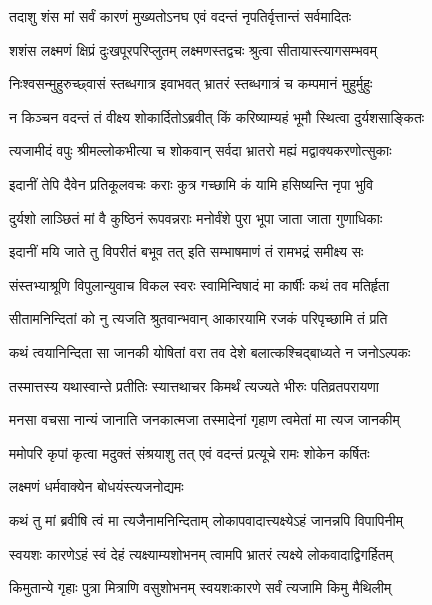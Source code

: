 \twolineshloka
{तदाशु शंस मां सर्वं कारणं मुख्यतोऽनघ}
{एवं वदन्तं नृपतिर्वृत्तान्तं सर्वमादितः}%

\twolineshloka
{शशंस लक्ष्मणं क्षिप्रं दुःखपूरपरिप्लुतम्}
{लक्ष्मणस्तद्वचः श्रुत्वा सीतायास्त्यागसम्भवम्}%

\twolineshloka
{निःश्वसन्मुहुरुच्छ्वासं स्तब्धगात्र इवाभवत्}
{भ्रातरं स्तब्धगात्रं च कम्पमानं मुहुर्मुहुः}%

\twolineshloka
{न किञ्चन वदन्तं तं वीक्ष्य शोकार्दितोऽब्रवीत्}
{किं करिष्याम्यहं भूमौ स्थित्वा दुर्यशसाङ्कितः}%

\twolineshloka
{त्यजामीदं वपुः श्रीमल्लोकभीत्या च शोकवान्}
{सर्वदा भ्रातरो मह्यं मद्वाक्यकरणोत्सुकाः}%

\twolineshloka
{इदानीं तेपि दैवेन प्रतिकूलवचः कराः}
{कुत्र गच्छामि कं यामि हसिष्यन्ति नृपा भुवि}%

\twolineshloka
{दुर्यशो लाञ्छितं मां वै कुष्ठिनं रूपवन्नराः}
{मनोर्वंशे पुरा भूपा जाता जाता गुणाधिकाः}%

\twolineshloka
{इदानीं मयि जाते तु विपरीतं बभूव तत्}
{इति सम्भाषमाणं तं रामभद्रं समीक्ष्य सः}%

\twolineshloka
{संस्तभ्याश्रूणि विपुलान्युवाच विकल स्वरः}
{स्वामिन्विषादं मा कार्षीः कथं तव मतिर्हृता}%

\twolineshloka
{सीतामनिन्दितां को नु त्यजति श्रुतवान्भवान्}
{आकारयामि रजकं परिपृच्छामि तं प्रति}%

\twolineshloka
{कथं त्वयानिन्दिता सा जानकी योषितां वरा}
{तव देशे बलात्कश्चिद्बाध्यते न जनोऽल्पकः}%

\twolineshloka
{तस्मात्तस्य यथास्वान्ते प्रतीतिः स्यात्तथाचर}
{किमर्थं त्यज्यते भीरुः पतिव्रतपरायणा}%

\twolineshloka
{मनसा वचसा नान्यं जानाति जनकात्मजा}
{तस्मादेनां गृहाण त्वमेतां मा त्यज जानकीम्}%

\twolineshloka
{ममोपरि कृपां कृत्वा मदुक्तं संश्रयाशु तत्}
{एवं वदन्तं प्रत्यूचे रामः शोकेन कर्षितः}%

\onelineshloka
{लक्ष्मणं धर्मवाक्येन बोधयंस्त्यजनोद्यमः}%


\twolineshloka
{कथं तु मां ब्रवीषि त्वं मा त्यजैनामनिन्दिताम्}
{लोकापवादात्त्यक्ष्येऽहं जानन्नपि विपापिनीम्}%

\twolineshloka
{स्वयशः कारणेऽहं स्वं देहं त्यक्ष्याम्यशोभनम्}
{त्वामपि भ्रातरं त्यक्ष्ये लोकवादाद्विगर्हितम्}%

\twolineshloka
{किमुतान्ये गृहाः पुत्रा मित्राणि वसुशोभनम्}
{स्वयशःकारणे सर्वं त्यजामि किमु मैथिलीम्}%

